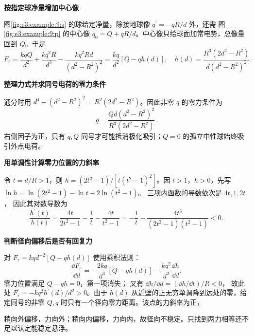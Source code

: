 \begin{solution}\textbf{按指定球净量增加中心像}\par\nobreak
图\ref{fig:e3:example:9:s} 的球给定净量，除接地球像 $q^\prime=-qR/d$ 外，还需 图\ref{fig:e3:example:9:p} 的中心像 $q_0=Q+qR/d$。中心像只给球面加常电势，总像量回到 $Q$。于是
\[
 F_r=\frac{kqQ}{d^2}+\frac{kq^2R}{d^3}
 -\frac{kq^2Rd}{(d^2-R^2)^2}
 =\frac{kq}{d^2}\left[Q-qh(d)\right],
\quad
 h(d)=\frac{R^3(2d^2-R^2)}{d(d^2-R^2)^2}.
\]


\par\medskip{}\noindent\textbf{整理力式并求同号电荷的零力条件}\par\nobreak
通分时用 $d^4-(d^2-R^2)^2=R^2(2d^2-R^2)$。因此非零 $q$ 的零力条件为
\[
 q=\frac{Qd(d^2-R^2)^2}{R^3(2d^2-R^2)}.
\]
右侧因子为正，只有 $q,Q$ 同号才可能抵消极化吸引；$Q=0$ 的孤立中性球始终吸引外点电荷。



\par\medskip{}\noindent\textbf{用单调性计算零力位置的力斜率}\par\nobreak
令 $t=d/R>1$，则 $h=(2t^2-1)/[t(t^2-1)^2]$。因 $t>1$，$h>0$，先写
$\ln h=\ln(2t^2-1)-\ln t-2\ln(t^2-1)$。
三项内函数的导数依次是 $4t,1,2t$，
因此其对数导数为
\[
 \frac{h^\prime(t)}{h(t)}
 =\frac{4t}{2t^2-1}-\frac1t-\frac{4t}{t^2-1}
 =-\frac1t-\frac{4t^3}{(2t^2-1)(t^2-1)}<0.
\]


\par\medskip{}\noindent\textbf{判断径向偏移后是否有回复力}\par\nobreak
对 $F_r=kqd^{-2}[Q-qh(d)]$ 使用乘积法则：
\[
 \frac{\dd F_r}{\dd d}
 =-\frac{2kq}{d^3}[Q-qh(d)]-\frac{kq^2}{d^2}\frac{\dd h}{\dd d}.
\]
零力位置满足 $Q-qh=0$，第一项消失；
又有 $\dd h/\dd d=(\dd h/\dd t)/R<0$，
故此处 $F_r^\prime=-kq^2h^\prime(d)/d^2>0$。由于 $h(d)$ 从近壁的正无穷单调降到远处的零，给定同号的非零 $Q,q$ 时只有一个径向零力距离。该点的力斜率为正，

稍向外偏移，力向外；稍向内偏移，力向内，故径向不稳定。只找到两力相等还不足以认定能稳定悬浮。\end{solution}
